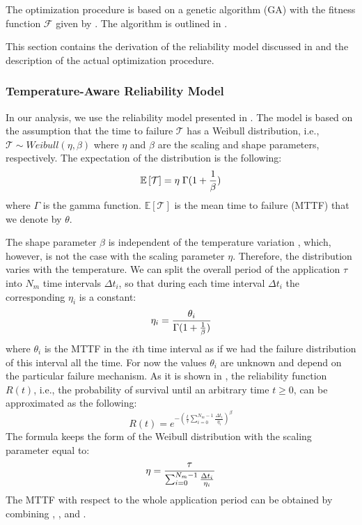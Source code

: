The optimization procedure is based on a genetic algorithm (GA)
\cite{schmitz2004} with the fitness function $\mathcal{F}$ given by
. The algorithm is outlined in .

This section contains the derivation of the reliability model discussed in
 and the description of the actual optimization
procedure.

\subsubsection{Temperature-Aware Reliability Model}

In our analysis, we use the reliability model presented in \cite{huang2009,
xiang2010}. The model is based on the assumption that the time to failure
$\mathcal{T}$ has a Weibull distribution, i.e., $\mathcal{T} \sim Weibull(\eta,
\beta)$ where $\eta$ and $\beta$ are the scaling and shape parameters,
respectively. The expectation of the distribution is the following:
\begin{equation} \elab{general-mttf}
  \mathbb{E}\left[\mathcal{T}\right] = \eta \; \Gamma(1 + \frac{1}{\beta})
\end{equation}
where $\Gamma$ is the gamma function. $\mathbb{E}\left[\mathcal{T}\right]$ is
the mean time to failure (MTTF) that we denote by $\theta$.

The shape parameter $\beta$ is independent of the temperature variation
\cite{chang2006}, which, however, is not the case with the scaling parameter
$\eta$. Therefore, the distribution varies with the temperature. We can split
the overall period of the application $\tau$ into $N_m$ time intervals $\Delta
t_i$, so that during each time interval $\Delta t_i$ the corresponding $\eta_i$
is a constant:
\begin{equation} \elab{eta-one}
  \eta_i = \frac{\theta_i}{\Gamma(1 + \frac{1}{\beta})}
\end{equation}
where $\theta_i$ is the MTTF in the $i$th time interval as if we had the failure
distribution of this interval all the time. For now the values $\theta_i$ are
unknown and depend on the particular failure mechanism. As it is shown in
\cite{xiang2010}, the reliability function $R(t)$, i.e., the probability of
survival until an arbitrary time $t \geq 0$, can be approximated as the
following:
\[
  R(t) = e^{-(\frac{t}{\tau} \sum_{i=0}^{N_m - 1} \frac{\Delta t_i}{\eta_i})^\beta}
\]
The formula keeps the form of the Weibull distribution with the scaling
parameter equal to:
\begin{equation} \elab{eta-many}
  \eta = \frac{\tau}{\sum_{i=0}^{N_m - 1} \frac{\Delta t_i}{\eta_i}}
\end{equation}
The MTTF with respect to the whole application period can be obtained by
combining , , and .


